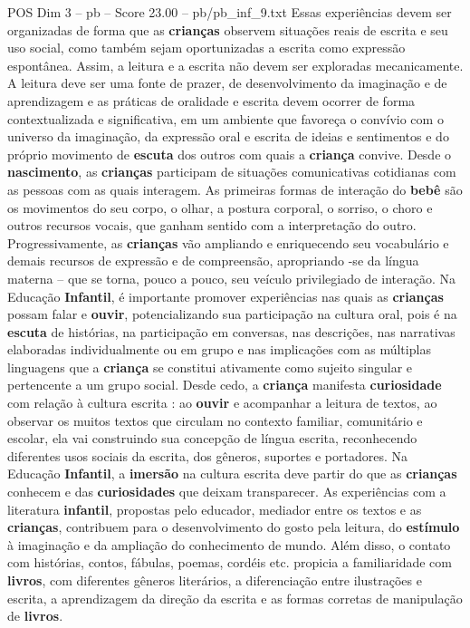 \begin{textsample}{POS Dim 3 – pb – Score 23.00 – pb/pb\_inf\_9.txt}
Essas experiências devem ser organizadas de forma que as \textbf{crianças} observem situações reais de escrita e seu uso social, como também sejam oportunizadas a escrita como expressão espontânea.
Assim, a leitura e a escrita não devem ser exploradas mecanicamente.
A leitura deve ser uma fonte de prazer, de desenvolvimento da imaginação e de aprendizagem e as práticas de oralidade e escrita devem ocorrer de forma contextualizada e significativa, em um ambiente que favoreça o convívio com o universo da imaginação, da expressão oral e escrita de ideias e sentimentos e do próprio movimento de \textbf{escuta} dos outros com quais a \textbf{criança} convive.
Desde o \textbf{nascimento}, as \textbf{crianças} participam de situações comunicativas cotidianas com as pessoas com as quais interagem.
As primeiras formas de interação do \textbf{bebê} são os movimentos do seu corpo, o olhar, a postura corporal, o sorriso, o choro e outros recursos vocais, que ganham sentido com a interpretação do outro.
Progressivamente, as \textbf{crianças} vão ampliando e enriquecendo seu vocabulário e demais recursos de expressão e de compreensão, apropriando -se da língua materna – que se torna, pouco a pouco, seu veículo privilegiado de interação.
Na Educação \textbf{Infantil}, é importante promover experiências nas quais as \textbf{crianças} possam falar e \textbf{ouvir}, potencializando sua participação na cultura oral, pois é na \textbf{escuta} de histórias, na participação em conversas, nas descrições, nas narrativas elaboradas individualmente ou em grupo e nas implicações com as múltiplas linguagens que a \textbf{criança} se constitui ativamente como sujeito singular e pertencente a um grupo social.
Desde cedo, a \textbf{criança} manifesta \textbf{curiosidade} com relação à cultura escrita : ao \textbf{ouvir} e acompanhar a leitura de textos, ao observar os muitos textos que circulam no contexto familiar, comunitário e escolar, ela vai construindo sua concepção de língua escrita, reconhecendo diferentes usos sociais da escrita, dos gêneros, suportes e portadores.
Na Educação \textbf{Infantil}, a \textbf{imersão} na cultura escrita deve partir do que as \textbf{crianças} conhecem e das \textbf{curiosidades} que deixam transparecer.
As experiências com a literatura \textbf{infantil}, propostas pelo educador, mediador entre os textos e as \textbf{crianças}, contribuem para o desenvolvimento do gosto pela leitura, do \textbf{estímulo} à imaginação e da ampliação do conhecimento de mundo.
Além disso, o contato com histórias, contos, fábulas, poemas, cordéis etc. propicia a familiaridade com \textbf{livros}, com diferentes gêneros literários, a diferenciação entre ilustrações e escrita, a aprendizagem da direção da escrita e as formas corretas de manipulação de \textbf{livros}.

\end{textsample}
